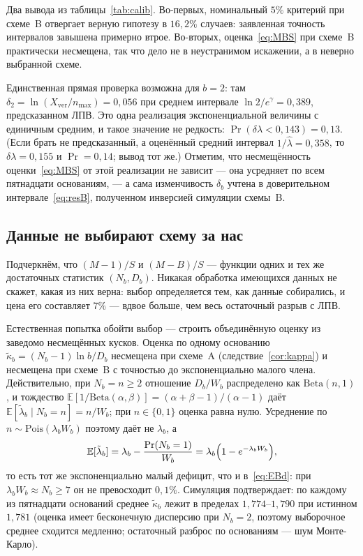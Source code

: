 \documentclass[11pt,a4paper]{article}
\theoremstyle{plain}
\theoremstyle{remark}
\newcommand{\eg}{e^{\gamma}}
\begin{document}
Два вывода из таблицы~\ref{tab:calib}. Во-первых, номинальный $5\%$ критерий при
схеме~B отвергает верную гипотезу в $16{,}2\%$ случаев: заявленная точность интервалов
завышена примерно втрое. Во-вторых, оценка~\eqref{eq:MBS} при схеме~B практически
несмещена, так что дело не в неустранимом искажении, а в неверно выбранной схеме.

Единственная прямая проверка возможна для $b=2$: там
$\delta_2=\ln(X_{\mathrm{ver}}/n_{\max})=0{,}056$ при среднем интервале
$\ln 2/\eg=0{,}389$, предсказанном ЛПВ.
Это одна реализация экспоненциальной величины с единичным средним, и такое значение
не редкость: $\Pr(\delta\lambda<0{,}143)=0{,}13$. (Если брать не предсказанный,
а оценённый средний интервал $1/\hat\lambda=0{,}358$, то $\delta\lambda=0{,}155$
и $\Pr=0{,}14$; вывод тот же.) Отметим, что несмещённость
оценки~\eqref{eq:MBS} от этой реализации не зависит --- она усредняет по всем
пятнадцати основаниям, --- а сама изменчивость $\delta_b$ учтена в доверительном
интервале~\eqref{eq:resB}, полученном инверсией симуляции схемы~B.

\subsection{Данные не выбирают схему за нас}\label{sec:noescape}

Подчеркнём, что $(M-1)/S$ и $(M-B)/S$ --- функции одних и тех же достаточных статистик
$(N_b,D_b)$. Никакая обработка имеющихся данных не скажет, какая из них верна: выбор
определяется тем, как данные собирались, и цена его составляет $7\%$ --- вдвое больше,
чем весь остаточный разрыв с ЛПВ.

Естественная попытка обойти выбор --- строить объединённую оценку из заведомо
несмещённых кусков.
Оценка по одному основанию $\tilde\kappa_b=(N_b-1)\ln b/D_b$ несмещена при схеме~A
(следствие~\ref{cor:kappa}) и несмещена при схеме~B с точностью до экспоненциально
малого члена. Действительно, при $N_b=n\ge2$ отношение $D_b/W_b$ распределено как
$\mathrm{Beta}(n,1)$, и тождество
$\mathbb E[1/\mathrm{Beta}(\alpha,\beta)]=(\alpha+\beta-1)/(\alpha-1)$ даёт
$\mathbb E[\tilde\lambda_b\mid N_b=n]=n/W_b$; при $n\in\{0,1\}$ оценка равна нулю.
Усреднение по $n\sim\mathrm{Pois}(\lambda_bW_b)$ поэтому даёт не $\lambda_b$, а
\[
  \mathbb E[\tilde\lambda_b]=\lambda_b-\frac{\Pr(N_b=1)}{W_b}
  =\lambda_b\Bigl(1-e^{-\lambda_bW_b}\Bigr),
\]
то есть тот же экспоненциально малый дефицит, что и в~\eqref{eq:EBd}: при
$\lambda_bW_b\approx N_b\ge7$ он не превосходит $0{,}1\%$. Симуляция подтверждает: по каждому из пятнадцати оснований среднее
$\tilde\kappa_b$ лежит в пределах $1{,}774$--$1{,}790$ при истинном $1{,}781$
(оценка имеет бесконечную дисперсию при $N_b=2$, поэтому выборочное среднее
сходится медленно; остаточный разброс по основаниям --- шум Монте-Карло).
\end{document}
